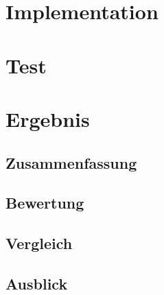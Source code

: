 \documentclass[a4paper]{scrartcl}
\begin{document}
\section{Implementation}

\section{Test}

\section{Ergebnis}
\subsection{Zusammenfassung}
\subsection{Bewertung}
\subsection{Vergleich}
\subsection{Ausblick}
\end{document}
